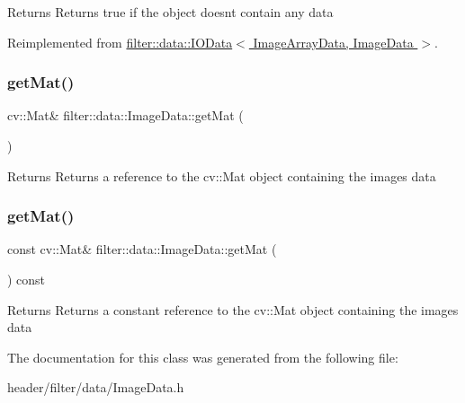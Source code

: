 \begin{DoxyReturn}{Returns}
Returns true if the object doesn\textquotesingle{}t contain any data 
\end{DoxyReturn}


Reimplemented from \hyperlink{classfilter_1_1data_1_1_i_o_data}{filter\+::data\+::\+I\+O\+Data$<$ Image\+Array\+Data, Image\+Data $>$}.

\mbox{\label{classfilter_1_1data_1_1_image_data_aed944725082cbf0ab8def1af23612917}} 
\subsubsection{\texorpdfstring{get\+Mat()}{getMat()}\hspace{0.1cm}{\footnotesize\ttfamily [1/2]}}
{\footnotesize\ttfamily cv\+::\+Mat\& filter\+::data\+::\+Image\+Data\+::get\+Mat (\begin{DoxyParamCaption}{ }\end{DoxyParamCaption})\hspace{0.3cm}{\ttfamily [inline]}}

\begin{DoxyReturn}{Returns}
Returns a reference to the cv\+::\+Mat object containing the image\textquotesingle{}s data 
\end{DoxyReturn}
\mbox{\label{classfilter_1_1data_1_1_image_data_abccbb6bc292443ba7772febadd6e4884}} 
\subsubsection{\texorpdfstring{get\+Mat()}{getMat()}\hspace{0.1cm}{\footnotesize\ttfamily [2/2]}}
{\footnotesize\ttfamily const cv\+::\+Mat\& filter\+::data\+::\+Image\+Data\+::get\+Mat (\begin{DoxyParamCaption}{ }\end{DoxyParamCaption}) const\hspace{0.3cm}{\ttfamily [inline]}}

\begin{DoxyReturn}{Returns}
Returns a constant reference to the cv\+::\+Mat object containing the image\textquotesingle{}s data 
\end{DoxyReturn}


The documentation for this class was generated from the following file\+:\begin{DoxyCompactItemize}
\item 
header/filter/data/Image\+Data.\+h\end{DoxyCompactItemize}
